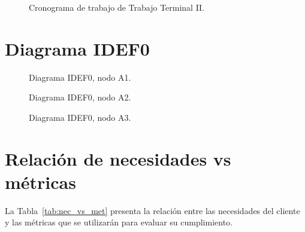 \documentclass[11pt,tesis,twoside,openright,spanish]{upiiztt}
\begin{document}
\begin{figure}[H]
  \centering
  \caption{Cronograma de trabajo de Trabajo Terminal II.}
  \label{fig:cronograma2}
\end{figure}
\chapter{Diagrama IDEF0}
\label{ap:idef0}

\begin{figure}[H]
  \centering
  \caption{Diagrama IDEF0, nodo A1.}
  \label{fig:idef0_A1}
\end{figure}

\begin{figure}[H]
  \centering
  \caption{Diagrama IDEF0, nodo A2.}
  \label{fig:idef0_A2}
\end{figure}

\begin{figure}[H]
  \centering
  \caption{Diagrama IDEF0, nodo A3.}
  \label{fig:idef0_A3}
\end{figure}
\chapter{Relación de necesidades vs métricas}
\label{ap:necesidades_vs_metricas}

La Tabla~\ref{tab:nec_vs_met} presenta la relación entre las necesidades del cliente y las métricas
que se utilizarán para evaluar su cumplimiento.
\end{document}
